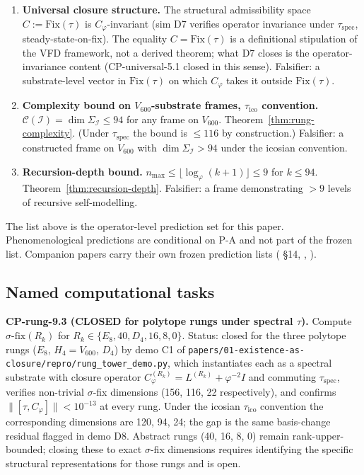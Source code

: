 \documentclass[11pt]{article}
\theoremstyle{plain}
\theoremstyle{definition}
\theoremstyle{remark}
\newcommand{\Ical}{\mathcal{I}}
\newcommand{\Ccal}{\mathcal{C}}
\newcommand{\Fix}{\mathrm{Fix}}
\newcommand{\Cph}{C_\varphi}
\begin{document}
\begin{enumerate}[leftmargin=2em, label=\textbf{F\arabic*.}]
\item \textbf{Universal closure structure.} The structural admissibility space $C := \Fix(\tau)$ is $\Cph$-invariant (sim D7 verifies operator invariance under $\tau_{\mathrm{spec}}$, steady-state-on-fix). The equality $C = \Fix(\tau)$ is a definitional stipulation of the VFD framework, not a derived theorem; what D7 closes is the operator-invariance content (CP-universal-5.1 closed in this sense). Falsifier: a substrate-level vector in $\Fix(\tau)$ on which $\Cph$ takes it outside $\Fix(\tau)$.
\item \textbf{Complexity bound on $V_{600}$-substrate frames, $\tau_{\mathrm{ico}}$ convention.} $\Ccal(\Ical) = \dim \Sigma_\Ical \leq 94$ for any frame on $V_{600}$. Theorem~\ref{thm:rung-complexity}. (Under $\tau_{\mathrm{spec}}$ the bound is $\leq 116$ by construction.) Falsifier: a constructed frame on $V_{600}$ with $\dim \Sigma_\Ical > 94$ under the icosian convention.
\item \textbf{Recursion-depth bound.} $n_{\max} \leq \lfloor \log_\varphi(k+1) \rfloor \leq 9$ for $k \leq 94$. Theorem~\ref{thm:recursion-depth}. Falsifier: a frame demonstrating $> 9$ levels of recursive self-modelling.
\end{enumerate}

The list above is the operator-level prediction set for this paper. Phenomenological predictions are conditional on P-A and not part of the frozen list. Companion papers carry their own frozen prediction lists (\citep{SmartLifeAsClosure} §14, \citep{SmartProcessingToPOV}, \citep{SmartCosmicClosure}).

\subsection{Named computational tasks}

\textbf{CP-rung-9.3 (CLOSED for polytope rungs under spectral $\tau$).} Compute $\sigma\text{-fix}(R_k)$ for $R_k \in \{E_8, 40, D_4, 16, 8, 0\}$. Status: closed for the three polytope rungs ($E_8$, $H_4 = V_{600}$, $D_4$) by demo C1 of \texttt{papers/01-existence-as-closure/repro/rung\_tower\_demo.py}, which instantiates each as a spectral substrate with closure operator $\Cph^{(R_k)} = L^{(R_k)} + \varphi^{-2} I$ and commuting $\tau_{\mathrm{spec}}$, verifies non-trivial $\sigma$-fix dimensions (156, 116, 22 respectively), and confirms $\|[\tau, \Cph]\| < 10^{-13}$ at every rung. Under the icosian $\tau_{\mathrm{ico}}$ convention the corresponding dimensions are 120, 94, 24; the gap is the same basis-change residual flagged in demo D8. Abstract rungs (40, 16, 8, 0) remain rank-upper-bounded; closing these to exact $\sigma$-fix dimensions requires identifying the specific structural representations for those rungs and is open.
\end{document}
